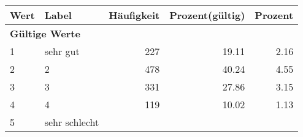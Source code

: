      \begin{longtable}{lXrrr}
     \toprule
     \textbf{Wert} & \textbf{Label} & \textbf{Häufigkeit} & \textbf{Prozent(gültig)} & \textbf{Prozent} \\
     \endhead
     \midrule
     \multicolumn{5}{l}{\textbf{Gültige Werte}}\\

     1 &
     \multicolumn{1}{X}{ sehr gut   } &


       \num{227} &
       \num[round-mode=places,round-precision=2]{19,11} &
         \num[round-mode=places,round-precision=2]{2,16} \\

     2 &
     \multicolumn{1}{X}{ 2   } &


       \num{478} &
       \num[round-mode=places,round-precision=2]{40,24} &
         \num[round-mode=places,round-precision=2]{4,55} \\

     3 &
     \multicolumn{1}{X}{ 3   } &


       \num{331} &
       \num[round-mode=places,round-precision=2]{27,86} &
         \num[round-mode=places,round-precision=2]{3,15} \\

     4 &
     \multicolumn{1}{X}{ 4   } &


       \num{119} &
       \num[round-mode=places,round-precision=2]{10,02} &
         \num[round-mode=places,round-precision=2]{1,13} \\

     5 &
     \multicolumn{1}{X}{ sehr schlecht   } &



\end{longtable}
